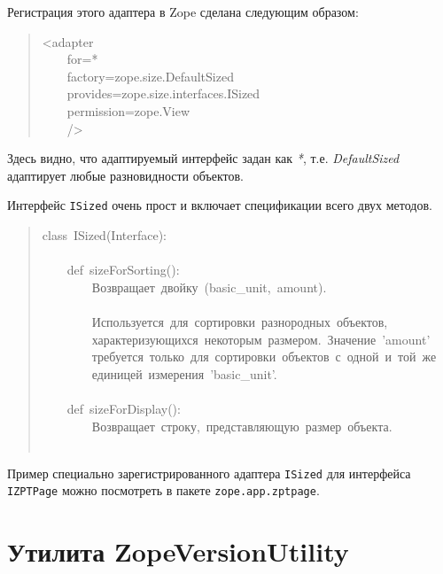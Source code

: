 \documentclass[a4paper,openany,twoside,final]{book}
\providecommand*{\DUroletitlereference}[1]{\textsl{#1}}
\begin{document}
Регистрация этого адаптера в Zope сделана следующим образом:

\begin{quote}{\ttfamily \raggedright \noindent
<adapter\\
~~~~for=\textquotedbl{}*\textquotedbl{}\\
~~~~factory=\textquotedbl{}zope.size.DefaultSized\textquotedbl{}\\
~~~~provides=\textquotedbl{}zope.size.interfaces.ISized\textquotedbl{}\\
~~~~permission=\textquotedbl{}zope.View\textquotedbl{}\\
~~~~/>
}
\end{quote}

Здесь видно, что адаптируемый интерфейс задан как \DUroletitlereference{*},
т.е. \DUroletitlereference{DefaultSized} адаптирует любые разновидности объектов.

Интерфейс \texttt{ISized} очень прост и включает спецификации всего двух
методов.

\begin{quote}{\ttfamily \raggedright \noindent
class~ISized(Interface):\\
~\\
~~~~def~sizeForSorting():\\
~~~~~~~~\textquotedbl{}\textquotedbl{}\textquotedbl{}Возвращает~двойку~(basic\_unit,~amount).\\
~\\
~~~~~~~~Используется~для~сортировки~разнородных~объектов,\\
~~~~~~~~характеризующихся~некоторым~размером.~Значение~'amount'\\
~~~~~~~~требуется~только~для~сортировки~объектов~с~одной~и~той~же\\
~~~~~~~~единицей~измерения~'basic\_unit'.\textquotedbl{}\textquotedbl{}\textquotedbl{}\\
~\\
~~~~def~sizeForDisplay():\\
~~~~~~~~\textquotedbl{}\textquotedbl{}\textquotedbl{}Возвращает~строку,~представляющую~размер~объекта.\\
~~~~~~~~\textquotedbl{}\textquotedbl{}\textquotedbl{}
}
\end{quote}

Пример специально зарегистрированного адаптера \texttt{ISized} для
интерфейса \texttt{IZPTPage} можно посмотреть в пакете \texttt{zope.app.zptpage}.


\section{Утилита ZopeVersionUtility%
  \label{zopeversionutility}%
}
\end{document}
